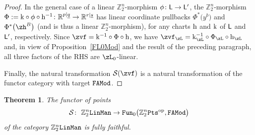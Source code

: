\documentclass[10pt,a4paper]{amsart}
\newcommand{\op}[1]{\operatorname{#1}}
\newcommand{\R}{{\mathbb R}}
\newcommand{\Z}{{\mathbb Z}}
\def\ul{\underline}
\def\ul{\underline}
\newcommand{\0}{\otimes}
\newcommand{\z}{\Z_2^n}
\numberwithin{equation}{section}
\newtheorem{Theorem}{Theorem}[section]
\begin{document}
\begin{proof}
In the general case of a linear $\z$-morphism $\phi\colon {\sf L}\to{\sf L}'$, the $\z$-morphism $\Phi:={\rm k}\circ\phi\circ{\rm h}^{-1}\colon \R^{p|\ul q}\to\R^{r|\ul s}$ has linear coordinate pullbacks $\Phi^*\big(y^b\big)$ and $\Phi^*\big(\zh^B\big)$ (and is thus a linear $\z$-morphism), for any charts $\rm h$ and $\rm k$ of $\sf L$ and ${\sf L}'$, respectively. Since $\zvf={\rm k}^{-1}\circ\Phi\circ{\rm h}$, we have $\zvf_\zL={\rm k}_\zL^{-1}\circ\Phi_\zL\circ{\rm h}_\zL$ and, in view of Proposition~\ref{FL0Mod} and the result of the preceding paragraph, all three factors of the {\small RHS} are $\zL_0$-linear.

Finally, the natural transformation $\mathcal{S}(\zvf)$ is a natural transformation of the functor category with target $\tt FAMod$.\end{proof}

\begin{Theorem}\label{FunPtsLinManFF}
The functor of points
\[
\mathcal{S}\colon\ \z{\tt LinMan}\to{\tt Fun}_0\big(\z{\tt Pts}^{\op{op}},\tt FAMod\big)
\]
of the category $\z\tt LinMan$ is fully faithful.
\end{Theorem}
\end{document}

